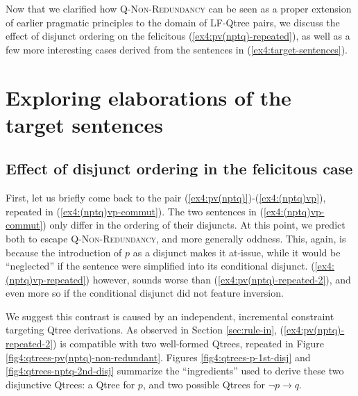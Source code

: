 Now that we clarified how \textsc{Q-Non-Redundancy} can be seen as a proper extension of earlier pragmatic principles to the domain of LF-Qtree pairs, we discuss the effect of disjunct ordering on the felicitous (\ref{ex4:pv(nptq)-repeated}), as well as a few more interesting cases derived from the sentences in (\ref{ex4:target-sentences}).

\section{Exploring elaborations of the target sentences}\label{sec4:exploration}
\subsection{Effect of disjunct ordering in the felicitous case}\label{sec4:ordering}

First, let us briefly come back to the pair (\ref{ex4:pv(nptq)})-(\ref{ex4:(nptq)vp}), repeated in (\ref{ex4:(nptq)vp-commut}). The two sentences in (\ref{ex4:(nptq)vp-commut}) only differ in the ordering of their disjuncts. At this point, we predict both to escape \textsc{Q-Non-Redundancy}, and more generally oddness. This, again, is because the introduction of $p$ as a disjunct makes it at-issue, while it would be ``neglected'' if the sentence were simplified into its conditional disjunct. (\ref{ex4:(nptq)vp-repeated}) however, sounds worse than (\ref{ex4:pv(nptq)-repeated-2}), and even more so if the conditional disjunct did not feature inversion.

\begin{exe}
	\ex \label{ex4:(nptq)vp-commut}
	\begin{xlist}
		\label{ex4:pv(nptq)-repeated-2}
		\label{ex4:(nptq)vp-repeated}
	\end{xlist}
\end{exe}

We suggest this contrast is caused by an independent, incremental constraint targeting Qtree derivations. As observed in Section \ref{sec:rule-in}, (\ref{ex4:pv(nptq)-repeated-2}) is compatible with two well-formed Qtrees, repeated in Figure \ref{fig4:qtrees-pv(nptq)-non-redundant}. Figures \ref{fig4:qtrees-p-1st-disj} and \ref{fig4:qtrees-nptq-2nd-disj} summarize the ``ingredients'' used to derive these two disjunctive Qtrees: a Qtree for $p$, and two possible Qtrees for $\neg p \rightarrow q$.


